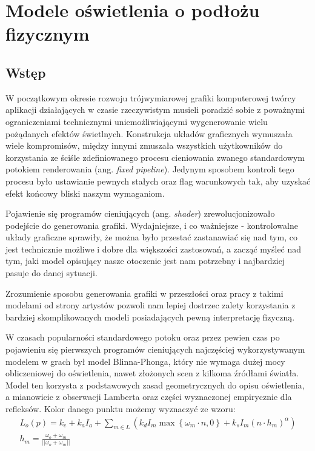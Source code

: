 \documentclass[../main.tex]{subfiles}
\begin{document}
\chapter{Modele oświetlenia o podłożu fizycznym}

\section{Wstęp}

W początkowym okresie rozwoju trójwymiarowej grafiki komputerowej twórcy aplikacji działających w czasie rzeczywistym musieli poradzić sobie z poważnymi ograniczeniami technicznymi uniemożliwiającymi wygenerowanie wielu pożądanych efektów świetlnych.
Konstrukcja układów graficznych wymuszała wiele kompromisów, między innymi zmuszała wszystkich użytkowników do korzystania ze ściśle zdefiniowanego procesu cieniowania zwanego standardowym potokiem renderowania (ang. \textit{fixed pipeline}). Jedynym sposobem kontroli tego procesu było ustawianie pewnych stałych oraz flag warunkowych tak, aby uzyskać efekt końcowy bliski naszym wymaganiom.

Pojawienie się programów cieniujących (ang. \textit{shader}) zrewolucjonizowało podejście do generowania grafiki. Wydajniejsze, i co ważniejsze - kontrolowalne układy graficzne sprawiły, że można było przestać zastanawiać się nad tym, co jest technicznie możliwe i dobre dla większości zastosowań, a zacząć myśleć nad tym, jaki model opisujący nasze otoczenie jest nam potrzebny i najbardziej pasuje do danej sytuacji.

Zrozumienie sposobu generowania grafiki w przeszłości oraz pracy z takimi modelami od strony artystów pozwoli nam lepiej dostrzec zalety korzystania z bardziej skomplikowanych modeli posiadających pewną interpretację fizyczną.

W czasach popularności standardowego potoku oraz przez pewien czas po pojawieniu się pierwszych programów cieniujących najczęściej wykorzystywanym modelem w grach był model Blinna-Phonga, który nie wymaga dużej mocy obliczeniowej do oświetlenia, nawet złożonych scen z kilkoma źródłami światła. Model ten korzysta z podstawowych zasad geometrycznych do opisu oświetlenia, a mianowicie z obserwacji Lamberta oraz części wyznaczonej empirycznie dla refleksów. Kolor danego punktu możemy wyznaczyć ze wzoru:
\begin{gather*}
  L_o(p) = 
  	k_e + 
  	k_a I_a +
    \sum_{m \in L} \left( {
      k_d I_m \max\left\{{ \omega_m \cdot n, 0 }\right\} +
      k_s I_m (n \cdot h_m)^{\alpha}
    } \right) \\
    h_m = \frac{\omega_o+\omega_m}{||\omega_o+\omega_m||}
\end{gather*}
\end{document}
